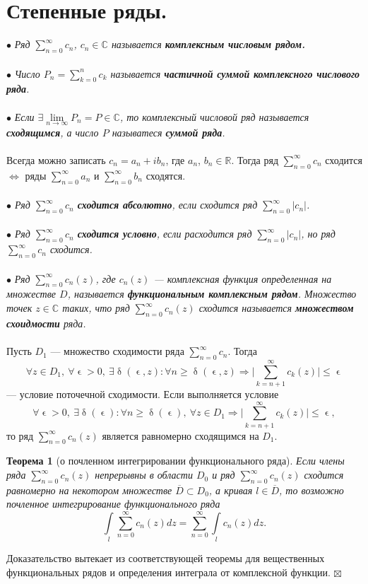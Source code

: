 \documentclass[a4paper, 12pt]{article}
\newenvironment{Proof} %
{\par\noindent{$\blacklozenge$}} %
{\hfill$\scriptstyle\boxtimes$}
\newcommand{\Rm}{\mathbb{R}}
\newcommand{\Cm}{\mathbb{C}}
\renewcommand{\leq}{\leqslant}
\renewcommand{\geq}{\geqslant}
\renewcommand{\delta}{\updelta}
\newcommand{\intl}{\int\limits_l}
\newcommand{\sumz}{\sum\limits_{n = 0}^\infty }
\renewcommand{\epsilon}{\upvarepsilon}
\newtheorem*{theorem}{Теорема}
\begin{document}
\section{Степенные ряды.}
$\bullet$\textit{ Ряд $\sum\limits_{n = 0}^\infty c_n$, $c_n \in \Cm$ называется \textbf{комплексным числовым рядом.} }\\\\
$\bullet$ \textit{Число $P_n = \sum\limits_{k=0}^n c_k$ называется \textbf{частичной суммой комплексного числового ряда}.}\\\\
$\bullet$ \textit{Если $\exists \lim\limits_{n\to\infty} P_n = P \in \Cm$, то комплексный числовой ряд называется \textbf{сходящимся}, а число $P$ называтеся \textbf{суммой ряда}.}\\\\
Всегда можно записать $c_n = a_n + ib_n$, где $a_n$, $b_n \in \Rm$. Тогда ряд $\sumz c_n$ сходится $\Longleftrightarrow$ ряды $\sumz a_n$ и $\sumz b_n$ сходятся.\\\\
\textit{$\bullet$ Ряд $\sumz c_n$ \textbf{сходится абсолютно}, если сходится ряд $\sumz |c_n|$.}\\\\
\textit{$\bullet$ Ряд $\sumz c_n$ \textbf{сходится условно}, если расходится ряд $\sumz |c_n|$, но ряд $\sumz c_n$ сходится.}\\\\
$\bullet$ \textit{Ряд $\sumz c_n(z)$, где $c_n(z)$ --- комплексная функция определенная на множестве $D$, называется \textbf{функциональным комплексным рядом}. Множество точек $z\in \Cm$ таких, что ряд $\sumz c_n(z)$ сходится называется \textbf{множеством схоидмости} ряда.}\\\\
Пусть $D_1$ --- множество сходимости ряда $\sumz c_n$. Тогда $$\forall z \in D_1,\ \forall\epsilon > 0,\ \exists \delta(\epsilon, z) : \forall n \geq \delta(\epsilon, z) \Rightarrow \Big|\sum\limits_{k = n+1}^\infty c_k(z)\Big| \leq \epsilon$$ --- условие поточечной сходимости. Если выполняется условие $$ \forall\epsilon > 0,\ \exists \delta(\epsilon): \forall n \geq \delta(\epsilon),\ \forall z \in D_1  \Rightarrow \Big|\sum\limits_{k = n+1}^\infty c_k(z)\Big| \leq \epsilon,$$ то ряд $\sumz c_n(z)$ является равномерно сходящимся на $D_1$.
\begin{theorem}
	[о почленном интегрировании функционального ряда]
	Если члены ряда $\sumz c_n(z)$ непрерывны в области $D_0$ и ряд $\sumz c_n(z)$ сходится равномерно на некотором множестве $\overline{D} \subset D_0$, а кривая $l \in \overline{D}$, то возможно почленное интегрирование функционального ряда $$\intl \sumz c_n(z)dz = \sumz \intl c_n(z)dz.$$
\end{theorem}\begin{Proof}
Доказательство вытекает из соответствующей теоремы для вещественных функциональных рядов и определения интеграла от комплексной функции.
\end{Proof}\\\\
\end{document}
